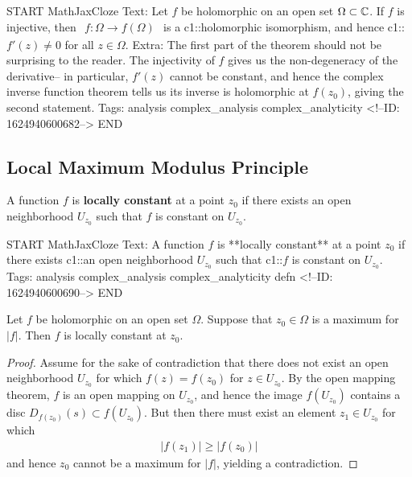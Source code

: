 \documentclass{memoir}
\begin{document}
\begin{anki}
START
MathJaxCloze
Text: Let \(f\) be holomorphic on an open set \(\Omega \subset \mathbb{C}\). If \(f\) is injective, then
\(\begin{align*}
  	f:\Omega \to f(\Omega )
  \end{align*}\)
is a {{c1::holomorphic isomorphism}}, and hence {{c1::\(f'(z)\neq 0\)}} for all \(z \in \Omega \).
Extra: The first part of the theorem should not be surprising to the reader. The injectivity of \(f\) gives us the non-degeneracy of the derivative-- in particular, \(f'(z)\) cannot be constant, and hence the complex inverse function theorem tells us its inverse is holomorphic at \(f(z_0)\), giving the second statement.
Tags: analysis complex_analysis complex_analyticity
<!--ID: 1624940600682-->
END
\end{anki}


\subsection{Local Maximum Modulus Principle}
\label{sub:local_maximum_modulus_principle}

\begin{defn}
	A function \(f\) is \textbf{locally constant} at a point \(z_0\) if there exists an open neighborhood \(U_{z_0}\) such that \(f\) is constant on \(U_{z_0}\).
\end{defn}

\begin{anki}
START
MathJaxCloze
Text: A function \(f\) is **locally constant** at a point \(z_0\) if there exists {{c1::an open neighborhood \(U_{z_0}\)}} such that {{c1::\(f\) is constant on \(U_{z_0}\)}}.
Tags: analysis complex_analysis complex_analyticity defn
<!--ID: 1624940600690-->
END
\end{anki}


\begin{thm}
	Let \(f\) be holomorphic on an open set \(\Omega \). Suppose that \(z_0 \in \Omega \) is a maximum for \(\left| f \right| \). Then \(f\) is locally constant at \(z_0\).
\end{thm}

\begin{proof}
	Assume for the sake of contradiction that there does not exist an open neighborhood \(U_{z_0}\) for which \(f(z)=f(z_0)\) for \(z \in U_{z_0}\). By the open mapping theorem, \(f\) is an open mapping on \(U_{z_0}\), and hence the image \(f(U_{z_0})\) contains a disc \(D_{f(z_0)}(s)\subset f(U_{z_0})\). But then there must exist an element \(z_1 \in U_{z_0}\) for which
	 \begin{align*}
		 \left| f(z_1) \right| \geq \left| f(z_0) \right| 
	\end{align*}
	and hence \(z_0\) cannot be a maximum for \(\left| f \right| \), yielding a contradiction.
\end{proof}
\end{document}
